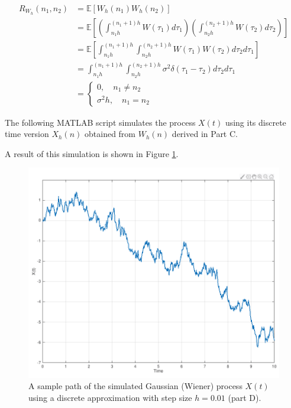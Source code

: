 \documentclass{cisXXX} %
\begin{document}
$$\begin{aligned} 
	R _ { W _ { h } } \left( n _ { 1 } , n _ { 2 } \right) & = \mathbb { E } \left[ W _ { h } \left( n _ { 1 } \right) W _ { h } \left( n _ { 2 } \right) \right] \\ 
	& = \mathbb { E } \left[ \left( \int _ { n _ { 1 } h } ^ { \left( n _ { 1 } + 1 \right) h } W \left( \tau _ { 1 } \right) d \tau _ { 1 } \right) \left( \int _ { n _ { 2 } h } ^ { \left( n _ { 2 } + 1 \right) h } W \left( \tau _ { 2 } \right) d \tau _ { 2 } \right) \right] \\ 
	& = \mathbb { E } \left[ \int _ { n _ { 1 } h } ^ { \left( n _ { 1 } + 1 \right) h } \int _ { n _ { 2 } h } ^ { \left( n _ { 2 } + 1 \right) h } W \left( \tau _ { 1 } \right) W \left( \tau _ { 2 } \right)  d \tau _ { 2 } d \tau _ { 1 } \right] \\ 
	& = \int _ { n _ { 1 } h } ^ { \left( n _ { 1 } + 1 \right) h } \int _ { n _ { 2 } h } ^ { \left( n _ { 2 } + 1 \right) h } \sigma^2 \delta \left( \tau _ { 1 } - \tau _ { 2 } \right) d \tau _ { 2 } d \tau _ { 1 }  \\ 
	& = \left\{ \begin{array} { l } { 0 , \quad n _ { 1 } \neq n _ { 2 }  } \\ { \sigma ^ { 2 } h , \quad n _ { 1 } = n _ { 2 }} \end{array} \right. 
\end{aligned}$$

\HWproblem
The following MATLAB script simulates the process $X(t)$  using its discrete time version $X_h(n)$ obtained from $W_h(n)$ derived in Part C.

A result of this simulation is shown in Figure \ref{fig:D1}.
\begin{figure}
  \includegraphics[width=\linewidth]{D_plot.png}
  \caption{A sample path of the simulated Gaussian (Wiener) process $X(t)$ using a discrete approximation
with step size $h = 0.01$ (part D).}
  \label{fig:D1}
\end{figure}
\end{document}
